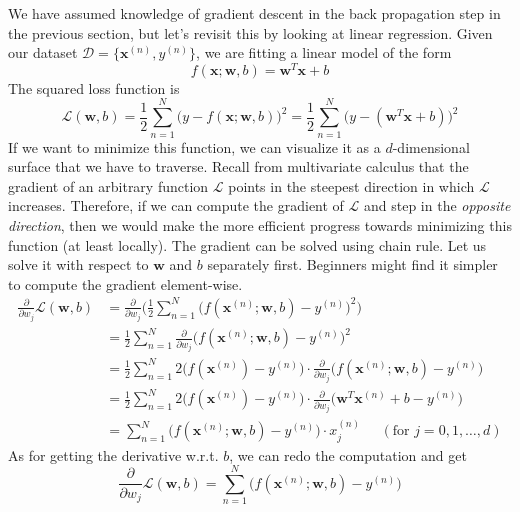   We have assumed knowledge of gradient descent in the back propagation step in the previous section, but let's revisit this by looking at linear regression. Given our dataset $\mathcal{D} = \{\mathbf{x}^(n), y^{(n)}\}$, we are fitting a linear model of the form 
  \begin{equation}
    f(\mathbf{x}; \mathbf{w}, b) = \mathbf{w}^T \mathbf{x} + b
  \end{equation} 
  The squared loss function is 
  \begin{equation}
    \mathcal{L}(\mathbf{w}, b) = \frac{1}{2} \sum_{n=1}^N \big( y - f(\mathbf{x}; \mathbf{w}, b) \big)^2 = \frac{1}{2} \sum_{n=1}^N \big( y - (\mathbf{w}^T \mathbf{x} + b) \big)^2  
  \end{equation}
  If we want to minimize this function, we can visualize it as a $d$-dimensional surface that we have to traverse. Recall from multivariate calculus that the gradient of an arbitrary function $\mathcal{L}$ points in the steepest direction in which $\mathcal{L}$ increases. Therefore, if we can compute the gradient of $\mathcal{L}$ and step in the \textit{opposite direction}, then we would make the more efficient progress towards minimizing this function (at least locally). The gradient can be solved using chain rule. Let us solve it with respect to $\mathbf{w}$ and $b$ separately first. Beginners might find it simpler to compute the gradient element-wise. 
  \begin{align}
    \frac{\partial}{\partial w_j} \mathcal{L}(\mathbf{w}, b) 
    & = \frac{\partial}{\partial w_j} \bigg(\frac{1}{2} \sum_{n=1}^N \Big( f (\mathbf{x}^{(n)}; \mathbf{w}, b) - y^{(n)} \Big)^2 \bigg) \\
    & = \frac{1}{2} \sum_{n=1}^N \frac{\partial}{\partial w_j} \Big( f(\mathbf{x}^{(n)}; \mathbf{w}, b) - y^{(n)}\Big)^2 \\
    & = \frac{1}{2} \sum_{n=1}^N 2 \Big( f(\mathbf{x}^{(n)}) - y^{(n)}\Big) \cdot \frac{\partial}{\partial w_j} \big( f(\mathbf{x}^{(n)}; \mathbf{w}, b) - y^{(n)} \big) \\
    & = \frac{1}{2} \sum_{n=1}^N 2 \Big( f(\mathbf{x}^{(n)}) - y^{(n)}\Big) \cdot \frac{\partial}{\partial w_j} \big( \mathbf{w}^T \mathbf{x}^{(n)} + b - y^{(n)} \big) \\
    & = \sum_{n=1}^N \big( f(\mathbf{x}^{(n)}; \mathbf{w}, b) - y^{(n)}\big) \cdot x_j^{(n)} \;\;\;\;\;(\text{for } j = 0, 1, \ldots, d)
  \end{align}
  As for getting the derivative w.r.t. $b$, we can redo the computation and get 
  \begin{equation}
    \frac{\partial}{\partial w_j}\mathcal{L}(\mathbf{w}, b) = \sum_{n=1}^N \big( f (\mathbf{x}^{(n)}; \mathbf{w}, b) - y^{(n)}\big) 
  \end{equation}
